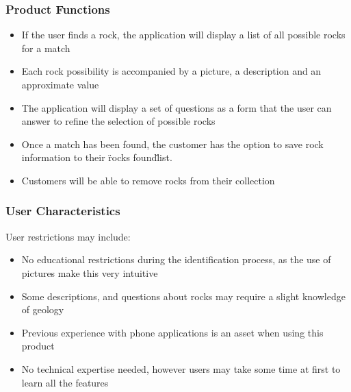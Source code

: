 \documentclass[titlepage]{article}
\begin{document}
\subsubsection{Product Functions}
\begin{itemize}
	\item If the user finds a rock, the application will display a list of all possible rocks for a match \\
	\item Each rock possibility is accompanied by a picture, a description and an approximate value\\
	\item The application will display a set of questions as a form that the user can answer to refine the selection of possible rocks\\
	\item Once a match has been found, the customer has the option to save rock information to their \"rocks found\" list.\\
	\item Customers will be able to remove rocks from their collection\\
\end{itemize}

\subsubsection{User Characteristics}

User restrictions may include:\\
\begin{itemize}
	\item No educational restrictions during the identification process, as the use of pictures make this very intuitive\\
	\item Some descriptions, and questions about rocks may require a slight knowledge of geology \\
	\item Previous experience with phone applications is an asset when using this product\\
	\item No technical expertise needed, however users may take some time at first to learn all the features\\
\end{itemize}
\end{document}
